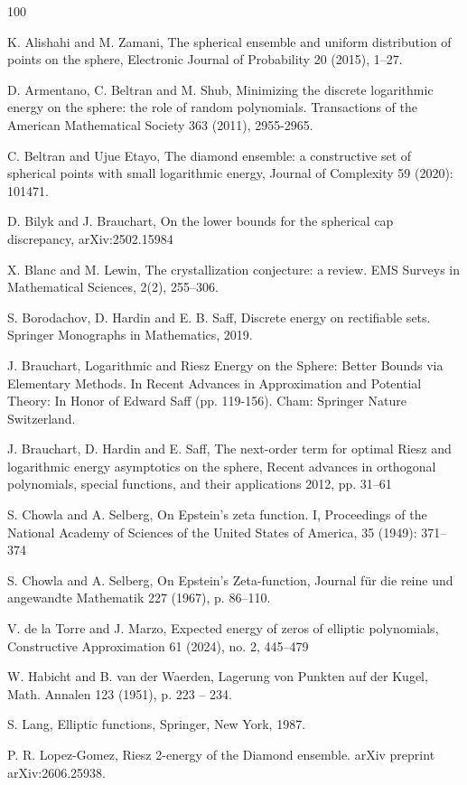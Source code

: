 \documentclass[10pt, reqno]{amsart}
\begin{document}
 \begin{thebibliography}{100}
 
 
  K. Alishahi and M. Zamani, The spherical ensemble and uniform distribution of points on
the sphere, Electronic Journal of Probability 20 (2015), 1--27. 

 D. Armentano, C. Beltran and M. Shub, Minimizing the discrete logarithmic energy on the sphere: the role of random polynomials. Transactions of the American Mathematical Society 363 (2011), 2955-2965.
 
 
  C. Beltran and Ujue Etayo, The diamond ensemble: a constructive set of spherical points with small logarithmic energy, Journal of Complexity 59 (2020): 101471.
 
  D. Bilyk and J. Brauchart, On the lower bounds for the spherical cap discrepancy, arXiv:2502.15984
 
  X. Blanc and M. Lewin, The crystallization conjecture: a review. EMS Surveys in Mathematical Sciences, 2(2), 255--306.

 S. Borodachov, D. Hardin and E. B. Saff,  Discrete energy on rectifiable sets. Springer Monographs in Mathematics, 2019.

 J. Brauchart, Logarithmic and Riesz Energy on the Sphere: Better Bounds via Elementary Methods. In Recent Advances in Approximation and Potential Theory: In Honor of Edward Saff (pp. 119-156). Cham: Springer Nature Switzerland.
 
  J. Brauchart, D. Hardin and E. Saff,  The next-order term for optimal Riesz and logarithmic energy asymptotics on the
sphere, Recent advances in orthogonal polynomials, special functions, and their applications 2012, pp. 31--61
 
  S. Chowla and A. Selberg, On Epstein's zeta function. I, Proceedings of the National Academy of Sciences of the United States of America, 35 (1949): 371--374
 
   S. Chowla and A. Selberg, On Epstein's Zeta-function, Journal für die reine und angewandte Mathematik 227 (1967), p. 86--110.
 
  V. de la Torre and J. Marzo, Expected energy of zeros of elliptic polynomials, Constructive
Approximation 61 (2024), no. 2, 445--479

  W. Habicht and B. van der Waerden, Lagerung von Punkten auf der Kugel, Math. Annalen 123 (1951), p. 223 -- 234.
  
   S. Lang, Elliptic functions, Springer, New York, 1987.
  
  P. R. Lopez-Gomez, Riesz 2-energy of the Diamond ensemble. arXiv preprint arXiv:2606.25938.


 \end{thebibliography}
 

   
   
\end{document}
